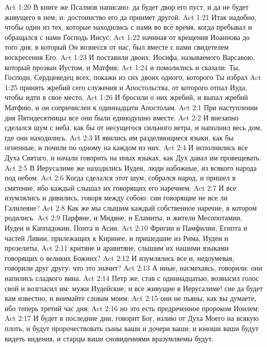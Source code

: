 \vs Act 1:20 В книге же Псалмов написано: да будет двор его пуст, и да не будет живущего в нем; и: достоинство его да приимет другой.
\vs Act 1:21 Итак надобно, чтобы один из тех, которые находились с нами во всё время, когда пребывал и обращался с нами Господь Иисус,
\vs Act 1:22 начиная от крещения Иоаннова до того дня, в который Он вознесся от нас, был вместе с нами свидетелем воскресения Его.
\vs Act 1:23 И поставили двоих: Иосифа, называемого Варсавою, который прозван Иустом, и Матфия;
\vs Act 1:24 и помолились и сказали: Ты, Господи, Сердцеведец всех, покажи из сих двоих одного, которого Ты избрал
\vs Act 1:25 принять жребий сего служения и Апостольства, от которого отпал Иуда, чтобы идти в свое место.
\vs Act 1:26 И бросили о них жребий, и выпал жребий Матфию, и он сопричислен к одиннадцати Апостолам.
\vs Act 2:1 При наступлении дня Пятидесятницы все они были единодушно вместе.
\vs Act 2:2 И внезапно сделался шум с неба, как бы от несущегося сильного ветра, и наполнил весь дом, где они находились.
\vs Act 2:3 И явились им разделяющиеся языки, как бы огненные, и почили по одному на каждом из них.
\vs Act 2:4 И исполнились все Духа Святаго, и начали говорить на иных языках, как Дух давал им провещевать.
\rsbpar\vs Act 2:5 В Иерусалиме же находились Иудеи, люди набожные, из всякого народа под небом.
\vs Act 2:6 Когда сделался этот шум, собрался народ, и пришел в смятение, ибо каждый слышал их говорящих его наречием.
\vs Act 2:7 И все изумлялись и дивились, говоря между собою: сии говорящие не все ли Галилеяне?
\vs Act 2:8 Как же мы слышим каждый собственное наречие, в котором родились.
\vs Act 2:9 Парфяне, и Мидяне, и Еламиты, и жители Месопотамии, Иудеи и Каппадокии, Понта и Асии,
\vs Act 2:10 Фригии и Памфилии, Египта и частей Ливии, прилежащих к Киринее, и пришедшие из Рима, Иудеи и прозелиты,
\vs Act 2:11 критяне и аравитяне, слышим их нашими языками говорящих о великих  Божиих?
\vs Act 2:12 И изумлялись все и, недоумевая, говорили друг другу: что это значит?
\vs Act 2:13 А иные, насмехаясь, говорили: они напились сладкого вина.
\rsbpar\vs Act 2:14 Петр же, став с одиннадцатью, возвысил голос свой и возгласил им: мужи Иудейские, и все живущие в Иерусалиме! сие да будет вам известно, и внимайте словам моим:
\vs Act 2:15 они не пьяны, как вы думаете, ибо теперь третий час дня;
\vs Act 2:16 но это есть предреченное пророком Иоилем:
\vs Act 2:17 И будет в последние дни, говорит Бог, излию от Духа Моего на всякую плоть, и будут пророчествовать сыны ваши и дочери ваши; и юноши ваши будут видеть видения, и старцы ваши сновидениями вразумляемы будут.
